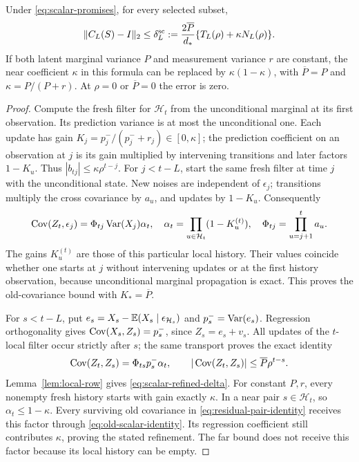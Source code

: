 \begin{theorem}
\label{thm:scalar-locality}
Under \eqref{eq:scalar-promises}, for every selected subset,
\begin{equation}
 \lVert C_L(S)-I\rVert_2\le\delta_L^{\mathrm{sc}}
 :=\frac{2\overline P}{d_*}
       \{T_L(\rho)+\kappa N_L(\rho)\}.
 \label{eq:scalar-refined-delta}
\end{equation}
If both latent marginal variance $P$ and measurement variance $r$ are
constant, the near coefficient $\kappa$ in this formula can be replaced by
$\kappa(1-\kappa)$, with $\overline P=P$ and $\kappa=P/(P+r)$.
At $\rho=0$ or $\overline P=0$ the error is zero.
\end{theorem}
\begin{proof}
Compute the fresh filter for $\mathcal H_t$ from the unconditional marginal
at its first observation. Its prediction variance is at most the
unconditional one. Each update has gain
$K_j=p_j^-/(p_j^-+r_j)\in[0,\kappa]$; the prediction coefficient on an
observation at $j$ is its gain multiplied by intervening transitions and
later factors $1-K_u$. Thus $|b_{tj}|\le\kappa\rho^{t-j}$.
For $j<t-L$, start the same fresh filter at time $j$ with the unconditional
state. New noises are independent of $\epsilon_j$; transitions multiply
the cross covariance by $a_u$, and updates by $1-K_u$. Consequently
\begin{equation}
 \operatorname{Cov}(Z_t,\epsilon_j)=\Phi_{tj}\operatorname{Var}(X_j)\alpha_t,
 \quad \alpha_t=\prod_{u\in\mathcal H_t}(1-K_u^{(t)}),
 \quad \Phi_{tj}=\prod_{u=j+1}^t a_u.
 \label{eq:old-scalar-identity}
\end{equation}
The gains $K_u^{(t)}$ are those of this particular local history. Their
values coincide whether one starts at $j$ without intervening updates or
at the first history observation, because unconditional marginal propagation
is exact. This proves the old-covariance bound with $K_*=\overline P$.

For $s<t-L$, put $e_s=X_s-\mathbb E(X_s\mid\epsilon_{\mathcal H_s})$ and
$p_s^-=\operatorname{Var}(e_s)$. Regression orthogonality gives
$\operatorname{Cov}(X_s,Z_s)=p_s^-$, since $Z_s=e_s+v_s$. All updates of the $t$-local
filter occur strictly after $s$; the same transport proves the exact identity
\begin{equation}
 \operatorname{Cov}(Z_t,Z_s)=\Phi_{ts}p_s^-\alpha_t,
 \qquad |\operatorname{Cov}(Z_t,Z_s)|\le\overline P\rho^{t-s}.
 \label{eq:far-scalar-identity}
\end{equation}
Lemma~\ref{lem:local-row} gives \eqref{eq:scalar-refined-delta}.
For constant $P,r$, every nonempty fresh history starts with gain exactly
$\kappa$. In a near pair $s\in\mathcal H_t$, so $\alpha_t\le1-\kappa$.
Every surviving old covariance in \eqref{eq:residual-pair-identity} receives
this factor through \eqref{eq:old-scalar-identity}. Its regression coefficient
still contributes $\kappa$, proving the stated refinement. The far bound
does not receive this factor because its local history can be empty.
\end{proof}

